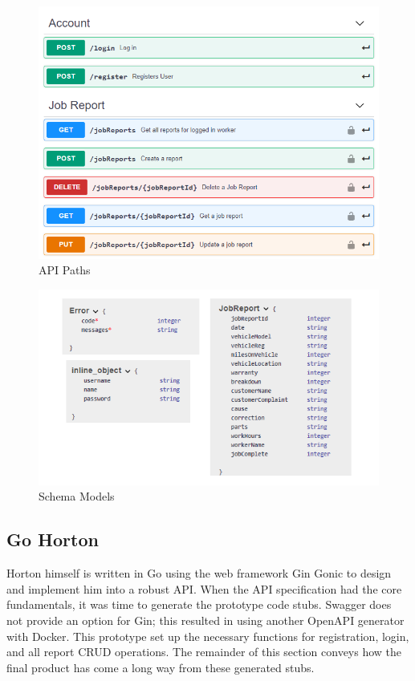 \begin{figure}[!ht]
    \caption{API Paths}
    \label{image:paths}
    \centering
    \includegraphics[width=1.0\textwidth]{images/open_api/paths.png}
\end{figure}

\begin{figure}[H]
    \caption{Schema Models}
    \label{image:models}
    \centering
    \includegraphics[width=1.0\textwidth]{images/open_api/shema_models2.png}
\end{figure}

\subsection{Go Horton}
Horton himself is written in Go using the web framework Gin Gonic to design and implement him into a robust API. When the API specification had the core fundamentals, it was time to generate the prototype code stubs. Swagger does not provide an option for Gin; this resulted in using another OpenAPI generator with Docker. This prototype set up the necessary functions for registration, login, and all report CRUD operations. The remainder of this section conveys how the final product has come a long way from these generated stubs.

